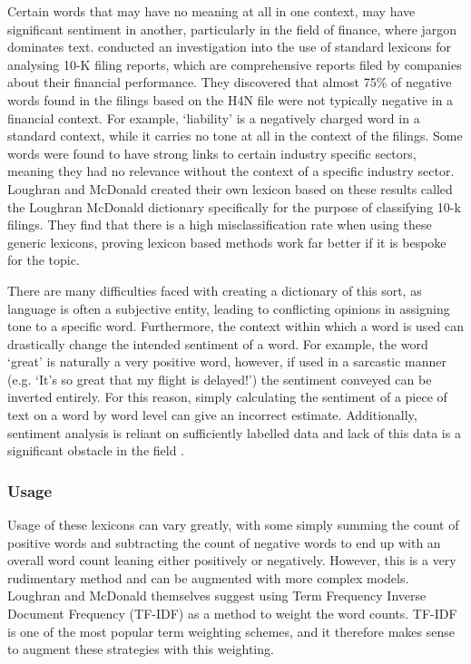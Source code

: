 Certain words that may have no meaning at all in one context, may have significant sentiment in another, particularly in the field of finance, where jargon dominates text. \textcite{lm-dict} conducted an investigation into the use of standard lexicons for analysing 10-K filing reports, which are comprehensive reports filed by companies about their financial performance. They discovered that almost 75\% of negative words found in the filings based on the H4N file were not typically negative in a financial context. For example, `liability' is a negatively charged word in a standard context, while it carries no tone at all in the context of the filings. Some words were found to have strong links to certain industry specific sectors, meaning they had no relevance without the context of a specific industry sector. Loughran and McDonald created their own lexicon based on these results called the Loughran McDonald dictionary specifically for the purpose of classifying 10-k filings. They find that there is a high misclassification rate when using these generic lexicons, proving lexicon based methods work far better if it is bespoke for the topic. 

There are many difficulties faced with creating a dictionary of this sort, as language is often a subjective entity, leading to conflicting opinions in assigning tone to a specific word. Furthermore, the context within which a word is used can drastically change the intended sentiment of a word. For example, the word `great' is naturally a very positive word, however, if used in a sarcastic manner (e.g. `It's so great that my flight is delayed!') the sentiment conveyed can be inverted entirely. For this reason, simply calculating the sentiment of a piece of text on a word by word level can give an incorrect estimate. Additionally, sentiment analysis is reliant on sufficiently labelled data and lack of this data is a significant obstacle in the field \parencite{madhoushi2015sentiment}.

\subsubsection{Usage}
Usage of these lexicons can vary greatly, with some simply summing the count of positive words and subtracting the count of negative words to end up with an overall word count leaning either positively or negatively. However, this is a very rudimentary method and can be augmented with more complex models. Loughran and McDonald themselves suggest using Term Frequency Inverse Document Frequency (TF-IDF) as a method to weight the word counts. TF-IDF is one of the most popular term weighting schemes, and it therefore makes sense to augment these strategies with this weighting.


